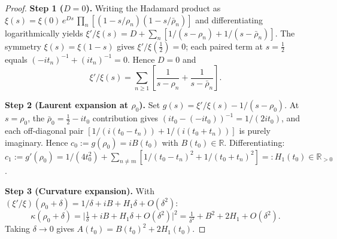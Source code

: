 \documentclass[11pt, a4paper]{article}
\theoremstyle{definition}
\theoremstyle{plain}
\begin{document}
\begin{proof}
\textbf{Step 1 ($D = 0$).}
Writing the Hadamard product as $\xi(s) = \xi(0)\,e^{Ds}\,\prod_n[(1-s/\rho_n)(1-s/\bar\rho_n)]$
and differentiating logarithmically yields
$\xi'/\xi(s) = D + \sum_n[1/(s-\rho_n) + 1/(s-\bar\rho_n)]$.
The symmetry $\xi(s) = \xi(1-s)$ gives $\xi'/\xi(\tfrac12) = 0$; each paired
term at $s = \tfrac12$ equals $(-it_n)^{-1} + (it_n)^{-1} = 0$.
Hence $D = 0$ and
\begin{equation}\label{eq:hadamard_logderiv}
  \xi'/\xi(s) = \sum_{n\ge 1}\!\left[\frac{1}{s-\rho_n}+\frac{1}{s-\bar\rho_n}\right].
\end{equation}

\textbf{Step 2 (Laurent expansion at $\rho_0$).}
Set $g(s) = \xi'/\xi(s) - 1/(s-\rho_0)$.  At $s = \rho_0$,
the $\bar\rho_0 = \tfrac12 - it_0$ contribution gives $(i t_0 - (-it_0))^{-1} = 1/(2it_0)$,
and each off-diagonal pair $[1/(i(t_0-t_n)) + 1/(i(t_0+t_n))]$ is purely imaginary.
Hence $c_0 := g(\rho_0) = iB(t_0)$ with $B(t_0) \in \mathbb{R}$.
Differentiating: $c_1 := g'(\rho_0) = 1/(4t_0^2) + \sum_{n\neq m}[1/(t_0-t_n)^2 + 1/(t_0+t_n)^2]
=: H_1(t_0) \in \mathbb{R}_{>0}$.

\textbf{Step 3 (Curvature expansion).}
With $(\xi'/\xi)(\rho_0+\delta) = 1/\delta + iB + H_1\delta + O(\delta^2)$:
\[
  \kappa(\rho_0+\delta)
  = \bigl|\tfrac1\delta + iB + H_1\delta + O(\delta^2)\bigr|^2
  = \tfrac{1}{\delta^2} + B^2 + 2H_1 + O(\delta^2).
\]
Taking $\delta\to 0$ gives $A(t_0) = B(t_0)^2 + 2H_1(t_0)$.
\end{proof}
\end{document}
